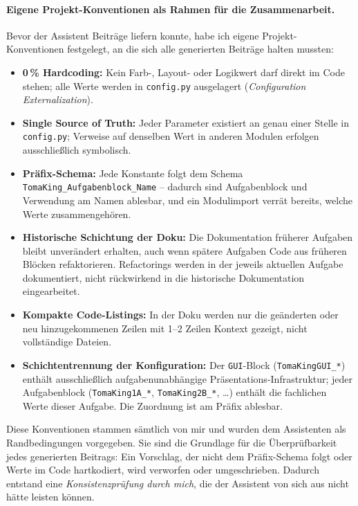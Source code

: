 \paragraph{Eigene Projekt-Konventionen als Rahmen für die Zusammenarbeit.}
Bevor der Assistent Beiträge liefern konnte, habe ich eigene Projekt-Konventionen festgelegt, an die sich alle generierten Beiträge halten mussten:

\begin{itemize}
    \item \textbf{0\,\% Hardcoding:} Kein Farb-, Layout- oder Logikwert darf direkt im Code stehen; alle Werte werden in \texttt{config.py} ausgelagert (\textit{Configuration Externalization}).
    \item \textbf{Single Source of Truth:} Jeder Parameter existiert an genau einer Stelle in \texttt{config.py}; Verweise auf denselben Wert in anderen Modulen erfolgen ausschließlich symbolisch.
    \item \textbf{Präfix-Schema:} Jede Konstante folgt dem Schema \texttt{TomaKing\_Aufgabenblock\_Name} -- dadurch sind Aufgabenblock und Verwendung am Namen ablesbar, und ein Modulimport verrät bereits, welche Werte zusammengehören.
    \item \textbf{Historische Schichtung der Doku:} Die Dokumentation früherer Aufgaben bleibt unverändert erhalten, auch wenn spätere Aufgaben Code aus früheren Blöcken refaktorieren. Refactorings werden in der jeweils aktuellen Aufgabe dokumentiert, nicht rückwirkend in die historische Dokumentation eingearbeitet.
    \item \textbf{Kompakte Code-Listings:} In der Doku werden nur die geänderten oder neu hinzugekommenen Zeilen mit 1--2 Zeilen Kontext gezeigt, nicht vollständige Dateien.
    \item \textbf{Schichtentrennung der Konfiguration:} Der \texttt{GUI}-Block (\texttt{TomaKingGUI\_*}) enthält ausschließlich aufgabenunabhängige Präsentations-Infrastruktur; jeder Aufgabenblock (\texttt{TomaKing1A\_*}, \texttt{TomaKing2B\_*}, \dots) enthält die fachlichen Werte dieser Aufgabe. Die Zuordnung ist am Präfix ablesbar.
\end{itemize}

Diese Konventionen stammen sämtlich von mir und wurden dem Assistenten als Randbedingungen vorgegeben. Sie sind die Grundlage für die Überprüfbarkeit jedes generierten Beitrags: Ein Vorschlag, der nicht dem Präfix-Schema folgt oder Werte im Code hartkodiert, wird verworfen oder umgeschrieben. Dadurch entstand eine \textit{Konsistenzprüfung durch mich}, die der Assistent von sich aus nicht hätte leisten können.

